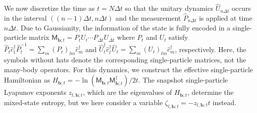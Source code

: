 \documentclass[preprint,pteplogo]{ptephy_v2}%
\numberwithin{equation}{section}
\theoremstyle{definition}
\begin{document}
We now discretize the time as $t=N\Delta t$ so that the unitary dynamics $\hat{U}_{n\Delta t}$ occurs in the interval $((n-1)\Delta t, n\Delta t)$ and the measurement $\hat{P}_{n\Delta t}$ is applied at time $n\Delta t$.
Due to Gaussianity, the information of the state is fully encoded in a single-particle matrix $\mathsf{M}_{\bm{b};t}=P_tU_t\cdots P_{\Delta t}U_{\Delta t}$ where $P_t$ and $U_t$ satisfy $\hat{P}_t \hat{c}_l^\dagger \hat{P}_t^{-1}=\sum_m (P_t)_{lm}\hat{c}_m^\dagger$ and $\hat{U}^\dagger_t \hat{c}_l^\dagger \hat{U}_t=\sum_m (U_t)_{lm} \hat{c}_m^\dagger$, respectively.
Here, the symbols without hats denote the corresponding single-particle matrices, not the many-body operators.
For this dynamics, we construct the effective single-particle Hamiltonian as $H_{\bm{b};t} = -\ln( \mathsf{M}_{\bm{b};t}\mathsf{M}^\dagger_{\bm{b};t})/2t$.
The snapshot single-particle Lyapunov exponents $z_{l, \bm{b};t}$, which are the eigenvalues of $H_{\bm{b};t}$, determine the mixed-state entropy, but we here consider a variable $\zeta_{l, \bm{b};t} = -z_{l, \bm{b};t}t$ instead.
\end{document}
